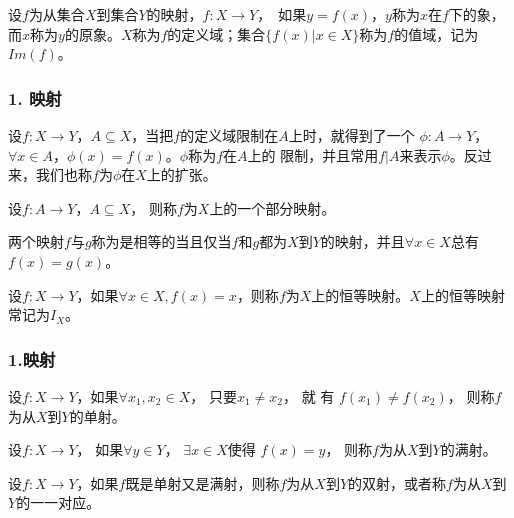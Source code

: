 \documentclass{beamer}
\begin{document}
\begin{CJK*}{UTF8}{gbsn}
\begin{frame}
  \begin{Def}\justifying\let\raggedright\justifying
    设$f$为从集合$X$到集合$Y$的映射，$f:X\to Y$，　如果$y = f(x)$，$y$称为$x$在$f$下的\alert{象}，而$x$称为$y$的\alert{原象}。$X$称为$f$的\alert{定义域}；集合$\{f(x) | x \in X\}$称为$f$的\alert{值域}，记为$Im(f)$。
  \end{Def}
\end{frame}
\begin{frame}
  \frametitle{1. 映射}

  \begin{Def}
    设$f:X\to Y$，$A\subseteq X$，当把$f$的定义域限制在$A$上时，就得到了一个
    $\phi: A\to Y$，$\forall x \in A$，$\phi(x) = f(x)$。$\phi$称为$f$在$A$上的
    \alert{限制}，并且常用$f|A$来表示$\phi$。反过来，我们也称$f$为$\phi$在$X$上的\alert{扩张}。
  \end{Def}\pause
    \begin{Def}
    设$f:A \to Y$，$A \subseteq X$， 则称$f$为$X$上的一个\alert{部分映射}。
  \end{Def}\pause
  \begin{Def}
    两个映射$f$与$g$称为是\alert{相等}的当且仅当$f$和$g$都为$X$到$Y$的映射，并且$\forall x \in X$总有$f(x) = g(x)$。
  \end{Def}\pause
  \begin{Def}
    设$f:X\to Y$，如果$\forall x \in X, f(x) = x$，则称$f$为$X$上的恒等映射。$X$上的恒等映射常记为$I_X$。
  \end{Def}

\end{frame}

\begin{frame}
  \frametitle{1.映射}
  \begin{Def}\justifying\let\raggedright\justifying
    设$f:X\to Y$，如果$\forall x_1, x_2 \in X$， 只要$x_1 \neq x_2$，  就 有 $f(x_1) \neq f(x_2)$，   则称$f$为从$X$到$Y$的\alert{单射}。
  \end{Def}
  \begin{Def}\justifying\let\raggedright\justifying
    设$f:X\to Y$， 如果$\forall y \in Y$， $\exists x \in X$使得 $f(x) = y$， 则称$f$为从$X$到$Y$的\alert{满射}。
  \end{Def}
  \begin{Def}\justifying\let\raggedright\justifying
    设$f:X\to Y$，如果$f$既是单射又是满射，则称$f$为从$X$到$Y$的\alert{双射}，或者称$f$为从$X$到$Y$的\alert{一一对应}。
  \end{Def}

\end{frame}

\end{CJK*}
\end{document}
